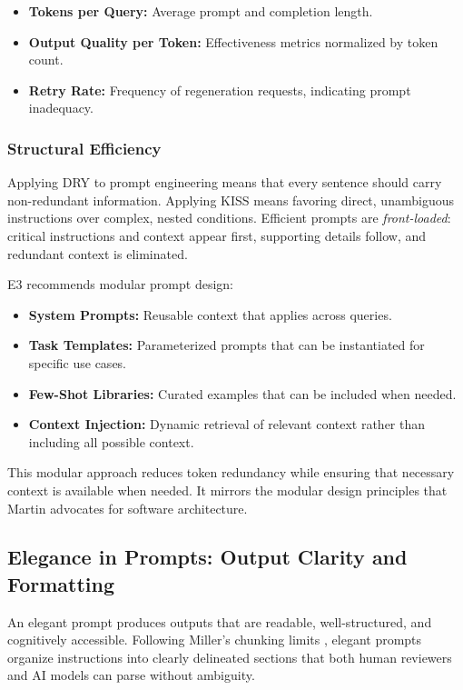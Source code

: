 \documentclass[11pt,a4paper]{article}
\begin{document}
\begin{itemize}[leftmargin=2em]
    \item \textbf{Tokens per Query:} Average prompt and completion length.
    \item \textbf{Output Quality per Token:} Effectiveness metrics normalized by token count.
    \item \textbf{Retry Rate:} Frequency of regeneration requests, indicating prompt inadequacy.
\end{itemize}


\subsubsection{Structural Efficiency}

Applying DRY to prompt engineering means that every sentence should carry non-redundant information. Applying KISS means favoring direct, unambiguous instructions over complex, nested conditions. Efficient prompts are \emph{front-loaded}: critical instructions and context appear first, supporting details follow, and redundant context is eliminated.

E3 recommends modular prompt design:

\begin{itemize}[leftmargin=2em]
    \item \textbf{System Prompts:} Reusable context that applies across queries.
    \item \textbf{Task Templates:} Parameterized prompts that can be instantiated for specific use cases.
    \item \textbf{Few-Shot Libraries:} Curated examples that can be included when needed.
    \item \textbf{Context Injection:} Dynamic retrieval of relevant context rather than including all possible context.
\end{itemize}

This modular approach reduces token redundancy while ensuring that necessary context is available when needed. It mirrors the modular design principles that Martin \cite{martin2017architecture} advocates for software architecture.

\subsection{Elegance in Prompts: Output Clarity and Formatting}

An elegant prompt produces outputs that are readable, well-structured, and cognitively accessible. Following Miller's chunking limits \cite{miller1956magical}, elegant prompts organize instructions into clearly delineated sections that both human reviewers and AI models can parse without ambiguity.
\end{document}
